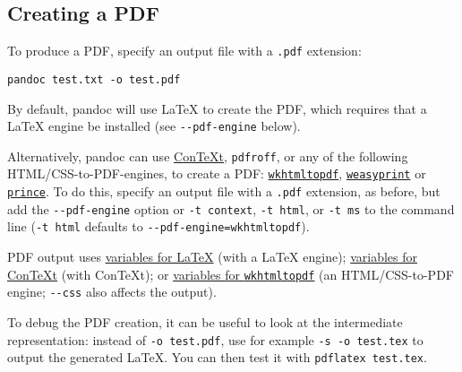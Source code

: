 \documentclass[
  12pt,
  a4paper,
]{article}
\begin{document}
\hypertarget{creating-a-pdf}{%
\subsection{Creating a PDF}\label{creating-a-pdf}}

To produce a PDF, specify an output file with a \texttt{.pdf} extension:

\begin{verbatim}
pandoc test.txt -o test.pdf
\end{verbatim}

By default, pandoc will use LaTeX to create the PDF, which requires that a LaTeX engine be
installed (see \texttt{-\/-pdf-engine} below).

Alternatively, pandoc can use \href{http://www.contextgarden.net/}{ConTeXt}, \texttt{pdfroff}, or
any of the following HTML/CSS-to-PDF-engines, to create a PDF:
\href{https://wkhtmltopdf.org}{\texttt{wkhtmltopdf}},
\href{http://weasyprint.org}{\texttt{weasyprint}} or
\href{https://www.princexml.com/}{\texttt{prince}}. To do this, specify an output file with a
\texttt{.pdf} extension, as before, but add the \texttt{-\/-pdf-engine} option or
\texttt{-t\ context}, \texttt{-t\ html}, or \texttt{-t\ ms} to the command line (\texttt{-t\ html}
defaults to \texttt{-\/-pdf-engine=wkhtmltopdf}).

PDF output uses \protect\hyperlink{variables-for-latex}{variables for LaTeX} (with a LaTeX
engine); \protect\hyperlink{variables-for-context}{variables for ConTeXt} (with ConTeXt); or
\protect\hyperlink{variables-for-wkhtmltopdf}{variables for \texttt{wkhtmltopdf}} (an
HTML/CSS-to-PDF engine; \texttt{-\/-css} also affects the output).

To debug the PDF creation, it can be useful to look at the intermediate representation: instead of
\texttt{-o\ test.pdf}, use for example \texttt{-s\ -o\ test.tex} to output the generated LaTeX.
You can then test it with \texttt{pdflatex\ test.tex}.
\end{document}
